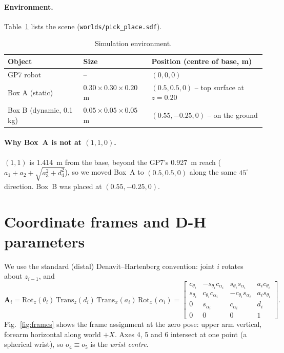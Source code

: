 \documentclass[11pt,a4paper]{article}
\newcommand{\cs}[1]{c_{#1}}
\newcommand{\sn}[1]{s_{#1}}
\begin{document}
\paragraph{Environment.}
Table~\ref{tab:world} lists the scene (\texttt{worlds/pick\_place.sdf}).
\begin{table}[h]
\centering\small
\begin{tabular}{lll}
\toprule
Object & Size & Position (centre of base, m) \\
\midrule
GP7 robot & -- & \((0, 0, 0)\) \\
Box A (static) & \(0.30\times0.30\times0.20\) m & \((0.5, 0.5, 0)\) \;-- top surface at \(z=0.20\) \\
Box B (dynamic, 0.1 kg) & \(0.05\times0.05\times0.05\) m & \((0.55, -0.25, 0)\) \;-- on the ground \\
\bottomrule
\end{tabular}
\caption{Simulation environment.}
\label{tab:world}
\end{table}

\paragraph{Why Box~A is not at \((1,1,0)\).}
\((1,1)\) is \SI{1.414}{m} from the base, beyond the GP7's \SI{0.927}{m} reach
(\(a_1+a_2+\sqrt{a_3^2+d_4^2}\)), so we moved Box~A to \((0.5, 0.5, 0)\) along the same
\(45^\circ\) direction. Box~B was placed at \((0.55,-0.25,0)\).

\section{Coordinate frames and D-H parameters}

We use the standard (distal) Denavit--Hartenberg convention: joint \(i\) rotates about
\(z_{i-1}\), and
\begin{equation}
\mathbf A_i = \mathrm{Rot}_{z}(\theta_i)\,\mathrm{Trans}_{z}(d_i)\,\mathrm{Trans}_{x}(a_i)\,\mathrm{Rot}_{x}(\alpha_i)
=\begin{bmatrix}
\cs{\theta_i} & -\sn{\theta_i}\cs{\alpha_i} & \sn{\theta_i}\sn{\alpha_i} & a_i\cs{\theta_i}\\
\sn{\theta_i} & \cs{\theta_i}\cs{\alpha_i} & -\cs{\theta_i}\sn{\alpha_i} & a_i\sn{\theta_i}\\
0 & \sn{\alpha_i} & \cs{\alpha_i} & d_i\\
0&0&0&1\end{bmatrix}.
\label{eq:dh}
\end{equation}
Fig.~\ref{fig:frames} shows the frame assignment at the zero pose: upper arm vertical,
forearm horizontal along world \(+X\). Axes 4, 5 and 6 intersect at one point (a spherical
wrist), so \(o_4 \equiv o_5\) is the \emph{wrist centre}.
\end{document}
